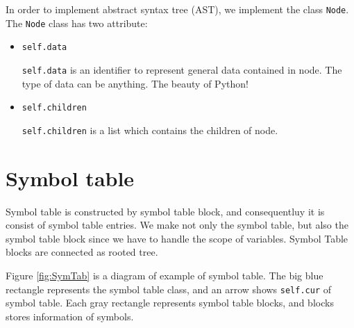 \documentclass{article}
\newcommand{\code}[1]{\texttt{#1}}
\begin{document}
	In order to implement abstract syntax tree (AST), we implement the class \code{Node}. The \code{Node} class has two attribute:

	\begin{itemize}
		\item \code{self.data}
		
		\code{self.data} is an identifier to represent general data contained in node. The type of data can be anything. The beauty of Python!

		\item \code{self.children}
		
		\code{self.children} is a list which contains the children of node.

	\end{itemize}

	\section{Symbol table}
	Symbol table is constructed by symbol table block, and consequentluy it is consist of symbol table entries. We make not only the symbol table, but also the symbol table block since we have to handle the scope of variables. Symbol Table blocks are connected as rooted tree.

	Figure \ref{fig:SymTab} is a diagram of example of symbol table. The big blue rectangle represents the symbol table class, and an arrow shows \code{self.cur} of symbol table. Each gray rectangle represents symbol table blocks, and blocks stores information of symbols.
\end{document}
